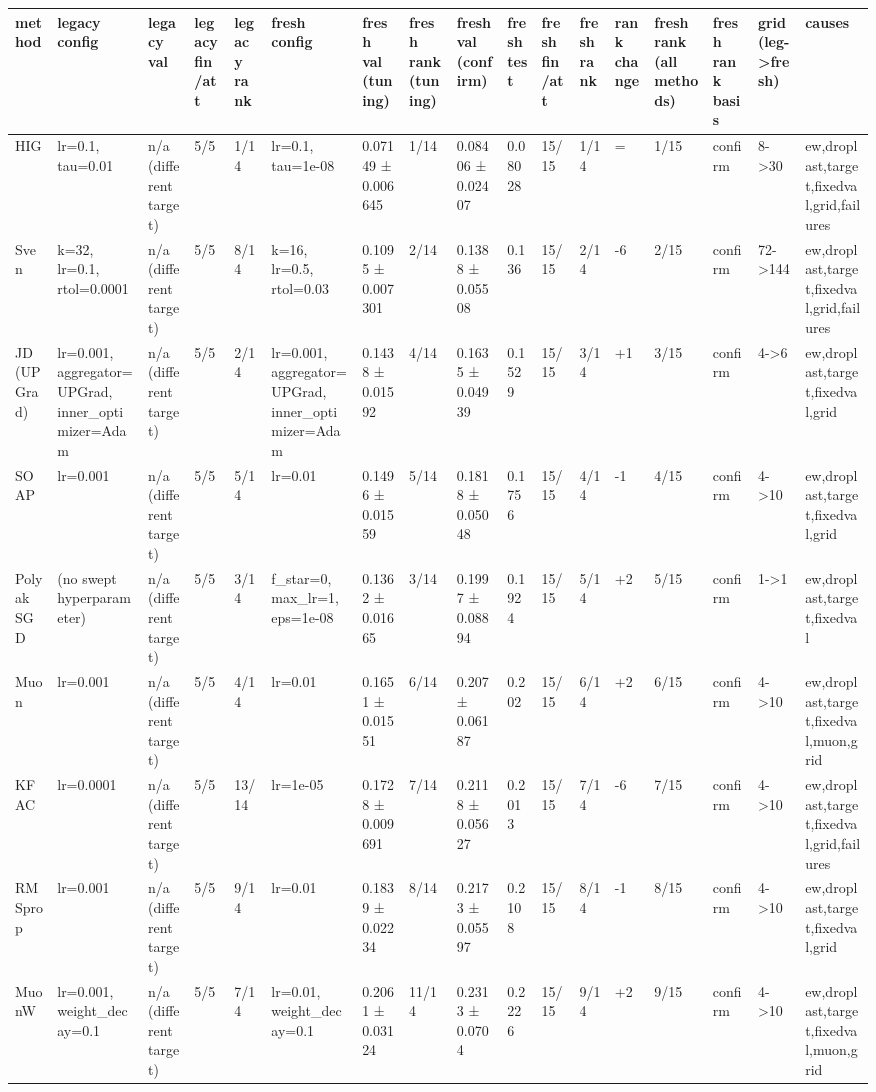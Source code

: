 \begin{tabular}{lllllllllllllllll}
\toprule
method & legacy config & legacy val & legacy fin/att & legacy rank & fresh config & fresh val (tuning) & fresh rank (tuning) & fresh val (confirm) & fresh test & fresh fin/att & fresh rank & rank change & fresh rank (all methods) & fresh rank basis & grid (leg->fresh) & causes \\
\midrule
HIG & lr=0.1, tau=0.01 & n/a (different target) & 5/5 & 1/14 & lr=0.1, tau=1e-08 & 0.07149 ± 0.006645 & 1/14 & 0.08406 ± 0.02407 & 0.08028 & 15/15 & 1/14 & = & 1/15 & confirm & 8->30 & ew,droplast,target,fixedval,grid,failures \\
Sven & k=32, lr=0.1, rtol=0.0001 & n/a (different target) & 5/5 & 8/14 & k=16, lr=0.5, rtol=0.03 & 0.1095 ± 0.007301 & 2/14 & 0.1388 ± 0.05508 & 0.136 & 15/15 & 2/14 & -6 & 2/15 & confirm & 72->144 & ew,droplast,target,fixedval,grid,failures \\
JD (UPGrad) & lr=0.001, aggregator=UPGrad, inner\_optimizer=Adam & n/a (different target) & 5/5 & 2/14 & lr=0.001, aggregator=UPGrad, inner\_optimizer=Adam & 0.1438 ± 0.01592 & 4/14 & 0.1635 ± 0.04939 & 0.1529 & 15/15 & 3/14 & +1 & 3/15 & confirm & 4->6 & ew,droplast,target,fixedval,grid \\
SOAP & lr=0.001 & n/a (different target) & 5/5 & 5/14 & lr=0.01 & 0.1496 ± 0.01559 & 5/14 & 0.1818 ± 0.05048 & 0.1756 & 15/15 & 4/14 & -1 & 4/15 & confirm & 4->10 & ew,droplast,target,fixedval,grid \\
Polyak SGD & (no swept hyperparameter) & n/a (different target) & 5/5 & 3/14 & f\_star=0, max\_lr=1, eps=1e-08 & 0.1362 ± 0.01665 & 3/14 & 0.1997 ± 0.08894 & 0.1924 & 15/15 & 5/14 & +2 & 5/15 & confirm & 1->1 & ew,droplast,target,fixedval \\
Muon & lr=0.001 & n/a (different target) & 5/5 & 4/14 & lr=0.01 & 0.1651 ± 0.01551 & 6/14 & 0.207 ± 0.06187 & 0.202 & 15/15 & 6/14 & +2 & 6/15 & confirm & 4->10 & ew,droplast,target,fixedval,muon,grid \\
KFAC & lr=0.0001 & n/a (different target) & 5/5 & 13/14 & lr=1e-05 & 0.1728 ± 0.009691 & 7/14 & 0.2118 ± 0.05627 & 0.2013 & 15/15 & 7/14 & -6 & 7/15 & confirm & 4->10 & ew,droplast,target,fixedval,grid,failures \\
RMSprop & lr=0.001 & n/a (different target) & 5/5 & 9/14 & lr=0.01 & 0.1839 ± 0.02234 & 8/14 & 0.2173 ± 0.05597 & 0.2108 & 15/15 & 8/14 & -1 & 8/15 & confirm & 4->10 & ew,droplast,target,fixedval,grid \\
MuonW & lr=0.001, weight\_decay=0.1 & n/a (different target) & 5/5 & 7/14 & lr=0.01, weight\_decay=0.1 & 0.2061 ± 0.03124 & 11/14 & 0.2313 ± 0.0704 & 0.2226 & 15/15 & 9/14 & +2 & 9/15 & confirm & 4->10 & ew,droplast,target,fixedval,muon,grid \\

\end{tabular}
